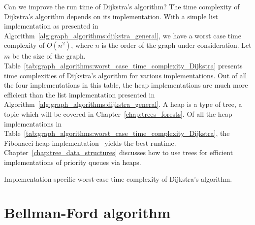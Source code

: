 Can we improve the run time of Dijkstra's
algorithm? The time complexity of
Dijkstra's algorithm depends on its implementation. With a simple
list implementation as presented in
Algorithm~\ref{alg:graph_algorithms:dijkstra_general}, we have a worst
case time complexity of $O(n^2)$, where $n$ is the order of the graph
under consideration. Let $m$ be the size of the
graph. Table~\ref{tab:graph_algorithms:worst_case_time_complexity_Dijkstra}
presents time complexities of Dijkstra's algorithm for various
implementations. Out of all the four implementations in this table,
the heap implementations are much more efficient than the list
implementation presented in
Algorithm~\ref{alg:graph_algorithms:dijkstra_general}. A heap is a type
of tree, a topic which will be covered in
Chapter~\ref{chap:trees_forests}. Of all the heap implementations in
Table~\ref{tab:graph_algorithms:worst_case_time_complexity_Dijkstra},
the Fibonacci heap
implementation~\cite{FredmanTarjan1987} yields the best
runtime. Chapter~\ref{chap:tree_data_structures} discusses how to use
trees for efficient implementations of priority queues via heaps.

\begin{table}[!htbp]
\centering
{}

\caption{Implementation specific worst-case time complexity of
  Dijkstra's algorithm.}
\label{tab:graph_algorithms:worst_case_time_complexity_Dijkstra}
\end{table}



\section{Bellman-Ford algorithm}

